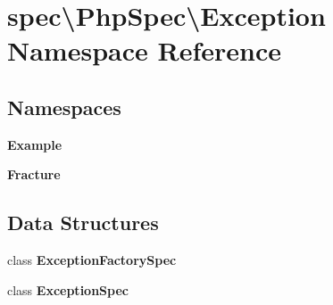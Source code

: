\section{spec\textbackslash{}Php\+Spec\textbackslash{}Exception Namespace Reference}
\label{namespacespec_1_1_php_spec_1_1_exception}
\subsection*{Namespaces}
\begin{DoxyCompactItemize}
\item 
 {\bf Example}
\item 
 {\bf Fracture}
\end{DoxyCompactItemize}
\subsection*{Data Structures}
\begin{DoxyCompactItemize}
\item 
class {\bf Exception\+Factory\+Spec}
\item 
class {\bf Exception\+Spec}
\end{DoxyCompactItemize}
